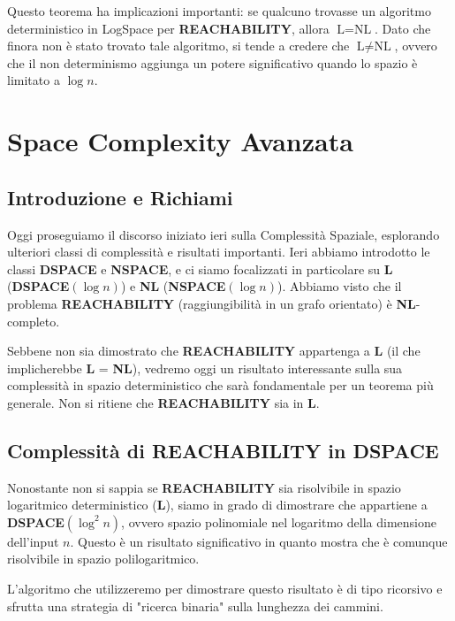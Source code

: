\documentclass[a4paper, 11pt]{book} %
\theoremstyle{definition}
\begin{document}
Questo teorema ha implicazioni importanti: se qualcuno trovasse un algoritmo deterministico in LogSpace per \textbf{REACHABILITY}, allora $\text{L} = \text{NL}$. Dato che finora non è stato trovato tale algoritmo, si tende a credere che $\text{L} \ne \text{NL}$, ovvero che il non determinismo aggiunga un potere significativo quando lo spazio è limitato a $\log n$.



\chapter{Space Complexity Avanzata}



\section{Introduzione e Richiami}
Oggi proseguiamo il discorso iniziato ieri sulla Complessità Spaziale, esplorando ulteriori classi di complessità e risultati importanti. Ieri abbiamo introdotto le classi \textbf{DSPACE} e \textbf{NSPACE}, e ci siamo focalizzati in particolare su \textbf{L} (\textbf{DSPACE}$(\log n)$) e \textbf{NL} (\textbf{NSPACE}$(\log n)$). Abbiamo visto che il problema \textbf{REACHABILITY} (raggiungibilità in un grafo orientato) è \textbf{NL}-completo.

Sebbene non sia dimostrato che \textbf{REACHABILITY} appartenga a \textbf{L} (il che implicherebbe \textbf{L} = \textbf{NL}), vedremo oggi un risultato interessante sulla sua complessità in spazio deterministico che sarà fondamentale per un teorema più generale. Non si ritiene che \textbf{REACHABILITY} sia in \textbf{L}.

\section{Complessità di REACHABILITY in DSPACE}
Nonostante non si sappia se \textbf{REACHABILITY} sia risolvibile in spazio logaritmico deterministico (\textbf{L}), siamo in grado di dimostrare che appartiene a \textbf{DSPACE}$(\log^2 n)$, ovvero spazio polinomiale nel logaritmo della dimensione dell'input $n$. Questo è un risultato significativo in quanto mostra che è comunque risolvibile in spazio polilogaritmico.

L'algoritmo che utilizzeremo per dimostrare questo risultato è di tipo ricorsivo e sfrutta una strategia di "ricerca binaria" sulla lunghezza dei cammini.
\end{document}
